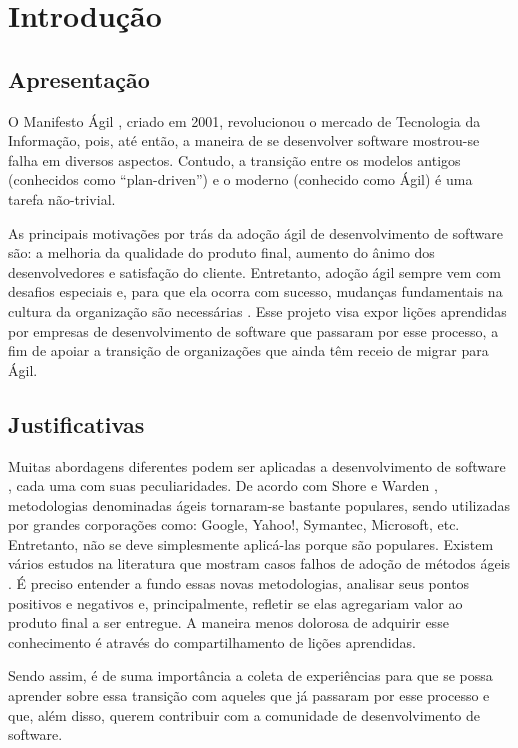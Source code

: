 \chapter{Introdução}

\section{Apresentação}

O Manifesto Ágil \cite{agileManifesto}, criado em 2001, revolucionou o mercado de Tecnologia da Informação, pois, até então, a maneira de se desenvolver software mostrou-se falha em diversos aspectos. Contudo, a transição entre os modelos antigos (conhecidos como “plan-driven”) e o moderno (conhecido como Ágil) é uma tarefa não-trivial.

As principais motivações por trás da adoção ágil de desenvolvimento de software são: a melhoria da qualidade do produto final, aumento do ânimo dos desenvolvedores e satisfação do cliente. Entretanto, adoção ágil sempre vem com desafios especiais e, para que ela ocorra com sucesso, mudanças fundamentais na cultura da organização são necessárias \cite{Hajjdiab2011}. Esse projeto visa expor lições aprendidas por empresas de desenvolvimento de software que passaram por esse processo, a fim de apoiar a transição de organizações que ainda têm receio de migrar para Ágil.

\section{Justificativas}

Muitas abordagens diferentes podem ser aplicadas a desenvolvimento de software \cite{Kettunen2010}, cada uma com suas peculiaridades. De acordo com Shore e Warden \cite{Shore2007}, metodologias denominadas ágeis tornaram-se bastante populares, sendo utilizadas por grandes corporações como: Google, Yahoo!, Symantec, Microsoft, etc. Entretanto, não se deve simplesmente aplicá-las porque são populares. Existem vários estudos na literatura que mostram casos falhos de adoção de métodos ágeis \cite{Krasteva2008}. É preciso entender a fundo essas novas metodologias, analisar seus pontos positivos e negativos e, principalmente, refletir se elas agregariam valor ao produto final a ser entregue. A maneira menos dolorosa de adquirir esse conhecimento é através do compartilhamento de lições aprendidas.

Sendo assim, é de suma importância a coleta de experiências para que se possa aprender sobre essa transição com aqueles que já passaram por esse processo e que, além disso, querem contribuir com a comunidade de desenvolvimento de software.

